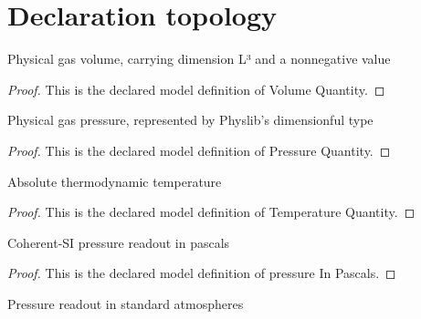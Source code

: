 \section{Declaration topology}
\begin{definition}
  \label{def:physics:phyx-mini-0362:phyxminiproblems-problemphyxmini0362-volumequantity}
  Physical gas volume, carrying dimension L³ and a nonnegative value
\end{definition}
\begin{proof}
  This is the declared model definition of Volume Quantity.
\end{proof}
\begin{definition}
  \label{def:physics:phyx-mini-0362:phyxminiproblems-problemphyxmini0362-pressurequantity}
  Physical gas pressure, represented by Physlib's dimensionful type
\end{definition}
\begin{proof}
  This is the declared model definition of Pressure Quantity.
\end{proof}
\begin{definition}
  \label{def:physics:phyx-mini-0362:phyxminiproblems-problemphyxmini0362-temperaturequantity}
  Absolute thermodynamic temperature
\end{definition}
\begin{proof}
  This is the declared model definition of Temperature Quantity.
\end{proof}
\begin{definition}
  \label{def:physics:phyx-mini-0362:phyxminiproblems-problemphyxmini0362-pressureinpascals}
  Coherent-SI pressure readout in pascals
\end{definition}
\begin{proof}
  This is the declared model definition of pressure In Pascals.
\end{proof}
\begin{definition}
  \label{def:physics:phyx-mini-0362:phyxminiproblems-problemphyxmini0362-pressureinatmospheres}
  Pressure readout in standard atmospheres
\end{definition}
